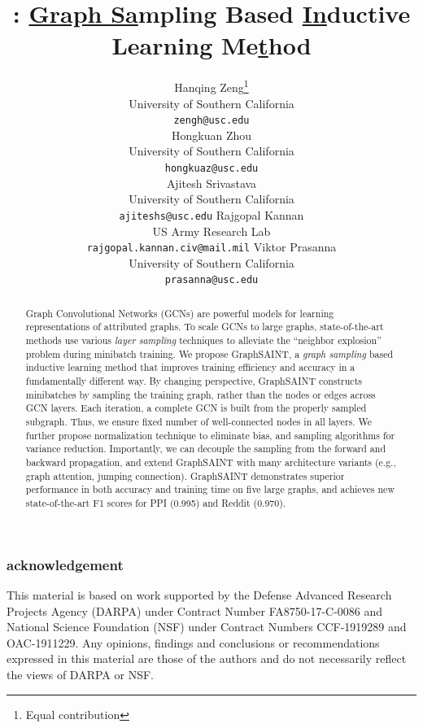 \documentclass{article} %
\title{\graphsaint: \underline{Graph Sa}mpling Based  \underline{In}ductive Learning Me\underline{t}hod}
\author{Hanqing Zeng\thanks{Equal contribution}\\
University of Southern California\\
\texttt{zengh@usc.edu}\\
\And
Hongkuan Zhou\footnotemark[1]\\
University of Southern California\\
\texttt{hongkuaz@usc.edu}\\
\And
Ajitesh Srivastava\\
University of Southern California\\
\texttt{ajiteshs@usc.edu}
\And
Rajgopal Kannan\\
US Army Research Lab\\
\texttt{rajgopal.kannan.civ@mail.mil}
\And
Viktor Prasanna\\
University of Southern California\\
\texttt{prasanna@usc.edu}}
\newcommand{\graphsaint}{{\fontfamily{lmtt}\selectfont GraphSAINT}}
\begin{document}
\maketitle

\begin{abstract}
Graph Convolutional Networks (GCNs) are powerful models for learning representations of attributed graphs. %
To scale GCNs to large graphs, state-of-the-art methods use various \emph{layer sampling} techniques to alleviate the ``neighbor explosion'' problem during minibatch training. 
We propose {\graphsaint}, a \emph{graph sampling} based inductive learning method that improves training efficiency and accuracy in a fundamentally different way. 
By changing perspective, {\graphsaint} constructs minibatches by sampling the training graph, rather than the nodes or edges across GCN layers. 
Each iteration, a complete GCN is built from the properly sampled subgraph. Thus, we ensure fixed number of well-connected nodes in all layers. 
We further propose normalization technique to eliminate bias, and sampling algorithms for variance reduction. 
Importantly, we can decouple the sampling from the forward and backward propagation, and extend {\graphsaint} with many architecture variants (e.g., graph attention, jumping connection).  
{\graphsaint} demonstrates superior performance in both accuracy and training time on five large graphs, and achieves new state-of-the-art F1 scores for PPI (0.995) and Reddit (0.970). 
\end{abstract}







\subsubsection*{acknowledgement}
This material is based on work supported
by the Defense Advanced Research Projects Agency (DARPA) under Contract Number FA8750-17-C-0086 and National Science Foundation (NSF) under Contract Numbers CCF-1919289 and OAC-1911229. Any opinions, findings and conclusions or recommendations
expressed in this material are those of the authors and do not necessarily reflect the views of DARPA or NSF.




\appendix

\end{document}
